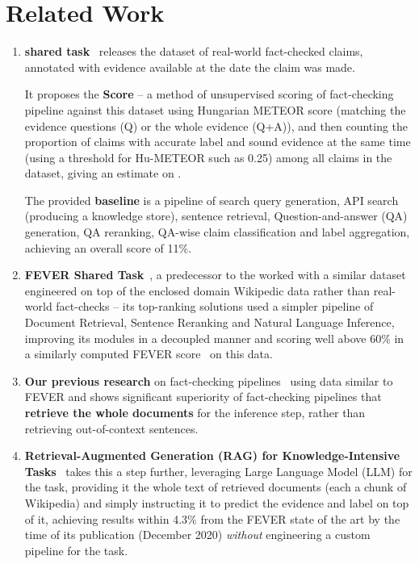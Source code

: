 \section{Related Work}
\label{sec:relwork}
\label{avscore}
\begin{enumerate}
    \item \textbf{\averitec{} shared task}~\cite{averitec2024} releases the dataset of real-world fact-checked claims, annotated with evidence available at the date the claim was made.
    
    It proposes the \textbf{\averitec{} Score} -- a method of unsupervised scoring of fact-checking pipeline against this dataset using Hungarian METEOR score (matching the evidence questions (Q) or the whole evidence (Q+A)), and then counting the proportion of claims with accurate label and sound evidence at the same time (using a threshold for Hu-METEOR such as 0.25) among all claims in the dataset, giving an estimate on .

    The provided \textbf{baseline} is a pipeline of search query generation, API search (producing a knowledge store), sentence retrieval, Question-and-answer (QA) generation, QA reranking, QA-wise claim classification and label aggregation, achieving an overall \averitec{} score of 11\%.  
    \item \textbf{FEVER Shared Task}~\cite{thorne-etal-2018-fact}, a predecessor to the \averitec{} worked with a similar dataset engineered on top of the enclosed domain Wikipedic data rather than real-world fact-checks -- its top-ranking solutions used a simpler pipeline of Document Retrieval, Sentence Reranking and Natural Language Inference, improving its modules in a decoupled manner and scoring well above 60\% in a similarly computed FEVER score~\cite{thorne-etal-2018-fever} on this data.
    \item \textbf{Our previous research} on fact-checking pipelines~\cite{Ullrich2023,drchal2023pipelinedatasetgenerationautomated} using data similar to FEVER and \averitec{} shows significant superiority of fact-checking pipelines that \textbf{retrieve the whole documents} for the inference step, rather than retrieving out-of-context sentences.
    \item \textbf{Retrieval-Augmented Generation (RAG) for Knowledge-Intensive Tasks}~\cite{rag} takes this a step further, leveraging Large Language Model (LLM) for the task, providing it the whole text of retrieved documents (each a chunk of Wikipedia) and simply instructing it to predict the evidence and label on top of it, achieving results within 4.3\% from the FEVER state of the art by the time of its publication (December 2020) \textit{without} engineering a custom pipeline for the task.
\end{enumerate}

